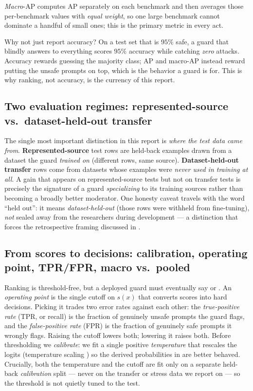 \emph{Macro}-AP computes AP separately on each benchmark and then averages those per-benchmark values
with \emph{equal weight}, so one large benchmark cannot dominate a handful of small ones; this is the
primary metric in every act.

\begin{takeaway}{Why not just report accuracy?}
On a test set that is $95\%$ safe, a guard that blindly answers  to everything scores $95\%$
accuracy while catching \emph{zero} attacks. Accuracy rewards guessing the majority class; AP and
macro-AP instead reward putting the unsafe prompts on top, which is the behavior a guard is for. This
is why ranking, not accuracy, is the currency of this report.
\end{takeaway}

\subsection{Two evaluation regimes: represented-source vs.\ dataset-held-out transfer}
\label{sec:bg-regimes}

The single most important distinction in this report is \emph{where the test data came from}.
\textbf{Represented-source} test rows are held-back examples drawn from a dataset the guard
\emph{trained on} (different rows, same source). \textbf{Dataset-held-out transfer} rows come from
datasets whose examples were \emph{never used in training at all}. A gain that appears on
represented-source tests but not on transfer tests is precisely the signature of a guard
\emph{specializing} to its training sources rather than becoming a broadly better moderator. One
honesty caveat travels with the word ``held out'': it means \emph{dataset-held-out} (those rows were
withheld from fine-tuning), \emph{not} sealed away from the researchers during development --- a
distinction that forces the retrospective framing discussed in .

\subsection{From scores to decisions: calibration, operating point, TPR/FPR, macro vs.\ pooled}
\label{sec:bg-op}

Ranking is threshold-free, but a deployed guard must eventually say  or . An
\emph{operating point} is the single cutoff on $s(x)$ that converts scores into hard decisions. Picking
it trades two error rates against each other: the \emph{true-positive rate} (TPR, or recall) is the
fraction of genuinely unsafe prompts the guard flags, and the \emph{false-positive rate} (FPR) is the
fraction of genuinely safe prompts it wrongly flags. Raising the cutoff lowers both; lowering it raises
both. Before thresholding we \emph{calibrate}: we fit a single positive \emph{temperature} that rescales
the logits (temperature scaling \citep{guo2017calibration}) so the derived probabilities in
 are better behaved. Crucially, both the temperature and the cutoff are fit only on a
separate held-back \emph{calibration} split --- never on the transfer or stress data we report on --- so
the threshold is not quietly tuned to the test.

